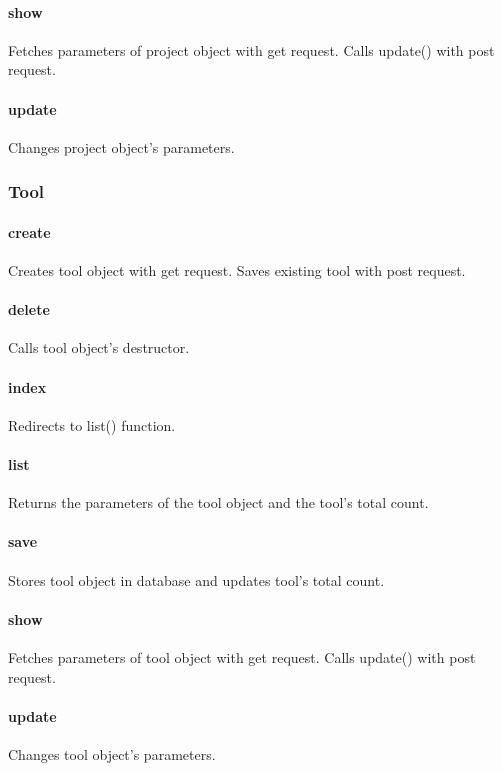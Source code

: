 \documentclass[12pt]{article}
\begin{document}
\paragraph{show} Fetches parameters of project object with get request. Calls update() with post request.
\paragraph{update} Changes project object's parameters.

\subsubsection{Tool}\label{sec:CTool}
\paragraph{create} Creates tool object with get request. Saves existing tool with post request.
\paragraph{delete} Calls tool object's destructor.
\paragraph{index} Redirects to list() function.
\paragraph{list} Returns the parameters of the tool object and the tool's total count.
\paragraph{save} Stores tool object in database and updates tool's total count.
\paragraph{show} Fetches parameters of tool object with get request. Calls update() with post request.
\paragraph{update} Changes tool object's parameters.
\end{document}
